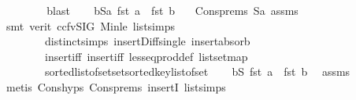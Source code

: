 \begin{isabellebody}
\ \ \ \ \isamarkupfalse%
\ {}\ \isamarkupfalse%
\ blast\isanewline
\isanewline
\ \ \isamarkupfalse%
\ {}{\isacharcolon}{\kern0pt}{\isachardoublequoteopen}{\isasymforall}b{\isasymin}S{}a{\isachardot}{\kern0pt}\ fst\ a\ {\isacharless}{\kern0pt}\ fst\ b{\isachardoublequoteclose}\ \isamarkupfalse%
\ {}\ Cons{\isachardot}{\kern0pt}prems{\isacharparenleft}{\kern0pt}{}{\isacharcomma}{\kern0pt}{}{\isacharparenright}{\kern0pt}\ S{}a\ assms{\isacharparenleft}{\kern0pt}{}{\isacharparenright}{\kern0pt}\ {}\isanewline
\ \ \ \ \isamarkupfalse%
\ {\isacharparenleft}{\kern0pt}smt\ {\isacharparenleft}{\kern0pt}verit{\isacharcomma}{\kern0pt}\ ccfv{\isacharunderscore}{\kern0pt}SIG{\isacharparenright}{\kern0pt}\ Min{\isacharunderscore}{\kern0pt}le\ list{\isachardot}{\kern0pt}simps{\isacharparenleft}{\kern0pt}{}{}{\isacharcomma}{\kern0pt}{}{}{\isacharcomma}{\kern0pt}{}{\isacharparenright}{\kern0pt}\isanewline
\ \ \ \ \ \ \ \ distinct{\isachardot}{\kern0pt}simps{\isacharparenleft}{\kern0pt}{}{\isacharparenright}{\kern0pt}\ insert{\isacharunderscore}{\kern0pt}Diff{\isacharunderscore}{\kern0pt}single\ insert{\isacharunderscore}{\kern0pt}absorb\isanewline
\ \ \ \ \ \ \ \ insert{\isacharunderscore}{\kern0pt}iff\ insert{\isacharunderscore}{\kern0pt}iff\ less{\isacharunderscore}{\kern0pt}eq{\isacharunderscore}{\kern0pt}prod{\isacharunderscore}{\kern0pt}def\ list{\isachardot}{\kern0pt}set{\isacharunderscore}{\kern0pt}map\isanewline
\ \ \ \ \ \ \ \ sorted{\isacharunderscore}{\kern0pt}list{\isacharunderscore}{\kern0pt}of{\isacharunderscore}{\kern0pt}set{\isachardot}{\kern0pt}set{\isacharunderscore}{\kern0pt}sorted{\isacharunderscore}{\kern0pt}key{\isacharunderscore}{\kern0pt}list{\isacharunderscore}{\kern0pt}of{\isacharunderscore}{\kern0pt}set{\isacharparenright}{\kern0pt}\isanewline
\isanewline
\ \ \isamarkupfalse%
\ {}{\isacharcolon}{\kern0pt}{\isachardoublequoteopen}{\isasymforall}b{\isasymin}S{}{\isachardot}{\kern0pt}\ fst\ a\ {\isacharless}{\kern0pt}\ fst\ b{\isachardoublequoteclose}\ \isamarkupfalse%
\ assms{\isacharparenleft}{\kern0pt}{}{\isacharcomma}{\kern0pt}{}{\isacharcomma}{\kern0pt}{}{\isacharparenright}{\kern0pt}\ \isanewline
\ \ \ \ \isamarkupfalse%
\ {\isacharparenleft}{\kern0pt}metis\ Cons{\isachardot}{\kern0pt}hyps{\isacharparenleft}{\kern0pt}{}{\isacharparenright}{\kern0pt}\ Cons{\isachardot}{\kern0pt}prems{\isacharparenleft}{\kern0pt}{}{\isacharcomma}{\kern0pt}{}{\isacharparenright}{\kern0pt}\ insertI{}\ list{\isachardot}{\kern0pt}simps{\isacharparenleft}{\kern0pt}{}{}{\isacharparenright}{\kern0pt}\isanewline

\end{isabellebody}

